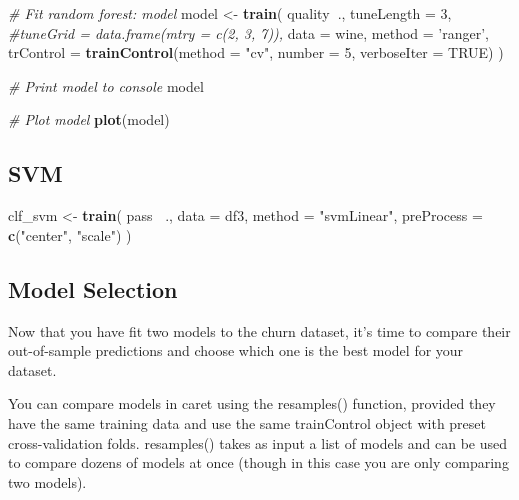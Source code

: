 \documentclass[]{book}
\newenvironment{Shaded}{\begin{snugshade}}{\end{snugshade}}
\newcommand{\KeywordTok}[1]{\textcolor[rgb]{0.13,0.29,0.53}{\textbf{#1}}}
\newcommand{\DataTypeTok}[1]{\textcolor[rgb]{0.13,0.29,0.53}{#1}}
\newcommand{\DecValTok}[1]{\textcolor[rgb]{0.00,0.00,0.81}{#1}}
\newcommand{\StringTok}[1]{\textcolor[rgb]{0.31,0.60,0.02}{#1}}
\newcommand{\CommentTok}[1]{\textcolor[rgb]{0.56,0.35,0.01}{\textit{#1}}}
\newcommand{\OtherTok}[1]{\textcolor[rgb]{0.56,0.35,0.01}{#1}}
\newcommand{\OperatorTok}[1]{\textcolor[rgb]{0.81,0.36,0.00}{\textbf{#1}}}
\newcommand{\NormalTok}[1]{#1}
\theoremstyle{definition}
\theoremstyle{definition}
\theoremstyle{definition}
\theoremstyle{remark}
\begin{document}
\begin{Shaded}
\begin{Highlighting}[]
\CommentTok{# Fit random forest: model}
\NormalTok{model <-}\StringTok{ }\KeywordTok{train}\NormalTok{(}
\NormalTok{  quality}\OperatorTok{~}\NormalTok{.,}
  \DataTypeTok{tuneLength =} \DecValTok{3}\NormalTok{,}
  \CommentTok{#tuneGrid = data.frame(mtry = c(2, 3, 7)),}
  \DataTypeTok{data =}\NormalTok{ wine, }
  \DataTypeTok{method =} \StringTok{'ranger'}\NormalTok{,}
  \DataTypeTok{trControl =} \KeywordTok{trainControl}\NormalTok{(}\DataTypeTok{method =} \StringTok{"cv"}\NormalTok{, }\DataTypeTok{number =} \DecValTok{5}\NormalTok{, }\DataTypeTok{verboseIter =} \OtherTok{TRUE}\NormalTok{)}
\NormalTok{)}

\CommentTok{# Print model to console}
\NormalTok{model}

\CommentTok{# Plot model}
\KeywordTok{plot}\NormalTok{(model)}
\end{Highlighting}
\end{Shaded}

\subsection{SVM}\label{svm-1}

\begin{Shaded}
\begin{Highlighting}[]
\NormalTok{clf_svm <-}\StringTok{ }\KeywordTok{train}\NormalTok{(}
\NormalTok{  pass }\OperatorTok{~}\NormalTok{., }
  \DataTypeTok{data =}\NormalTok{ df3, }
  \DataTypeTok{method =} \StringTok{"svmLinear"}\NormalTok{,}
  \DataTypeTok{preProcess =} \KeywordTok{c}\NormalTok{(}\StringTok{"center"}\NormalTok{, }\StringTok{"scale"}\NormalTok{)}
\NormalTok{                 )}
\end{Highlighting}
\end{Shaded}

\subsection{Model Selection}\label{model-selection-1}

Now that you have fit two models to the churn dataset, it's time to
compare their out-of-sample predictions and choose which one is the best
model for your dataset.

You can compare models in caret using the resamples() function, provided
they have the same training data and use the same trainControl object
with preset cross-validation folds. resamples() takes as input a list of
models and can be used to compare dozens of models at once (though in
this case you are only comparing two models).
\end{document}
